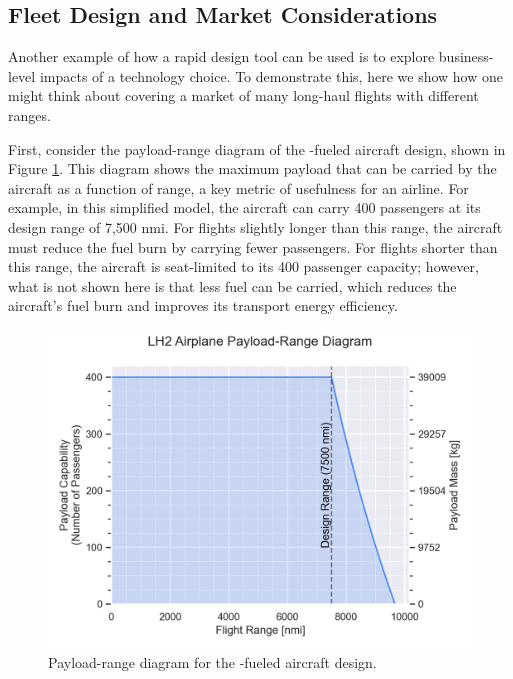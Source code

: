 \subsection{Fleet Design and Market Considerations}

Another example of how a rapid design tool can be used is to explore business-level impacts of a technology choice. To demonstrate this, here we show how one might think about covering a market of many long-haul flights with different ranges.

First, consider the payload-range diagram of the \lh-fueled aircraft design, shown in Figure \ref{fig:h2_payload_range}. This diagram shows the maximum payload that can be carried by the aircraft as a function of range, a key metric of usefulness for an airline. For example, in this simplified model, the aircraft can carry 400 passengers at its design range of 7,500 nmi. For flights slightly longer than this range, the aircraft must reduce the fuel burn by carrying fewer passengers. For flights shorter than this range, the aircraft is seat-limited to its 400 passenger capacity; however, what is not shown here is that less fuel can be carried, which reduces the aircraft's fuel burn and improves its transport energy efficiency.

\begin{figure}[H]
    \centering
    \includegraphics[width=5in]{../figures/Hydrogen/ppt/media/image30.png}
    \caption{Payload-range diagram for the \lh-fueled aircraft design.}
    \label{fig:h2_payload_range}
\end{figure}

